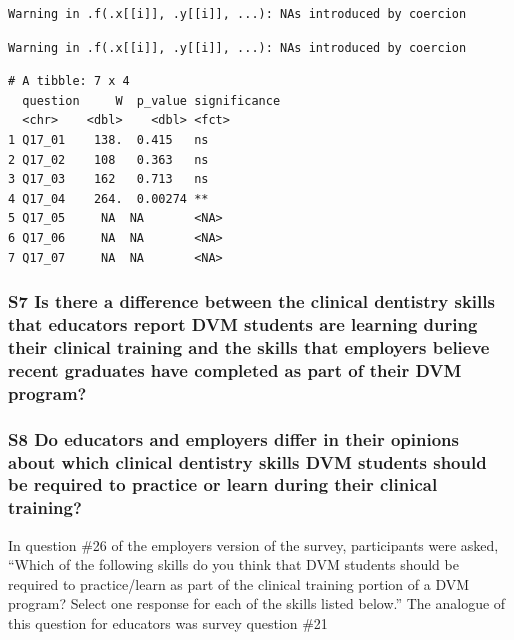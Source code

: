 \documentclass[
  11pt,
  letterpaper,
  DIV=11,
  numbers=noendperiod]{scrartcl}
\begin{document}
\begin{verbatim}
Warning in .f(.x[[i]], .y[[i]], ...): NAs introduced by coercion
\end{verbatim}

\begin{verbatim}
Warning in .f(.x[[i]], .y[[i]], ...): NAs introduced by coercion
\end{verbatim}

\begin{verbatim}
# A tibble: 7 x 4
  question     W  p_value significance
  <chr>    <dbl>    <dbl> <fct>       
1 Q17_01    138.  0.415   ns          
2 Q17_02    108   0.363   ns          
3 Q17_03    162   0.713   ns          
4 Q17_04    264.  0.00274 **          
5 Q17_05     NA  NA       <NA>        
6 Q17_06     NA  NA       <NA>        
7 Q17_07     NA  NA       <NA>        
\end{verbatim}

\subsubsection{S7 Is there a difference between the clinical dentistry
skills that educators report DVM students are learning during their
clinical training and the skills that employers believe recent graduates
have completed as part of their DVM
program?}\label{s7-is-there-a-difference-between-the-clinical-dentistry-skills-that-educators-report-dvm-students-are-learning-during-their-clinical-training-and-the-skills-that-employers-believe-recent-graduates-have-completed-as-part-of-their-dvm-program}

\subsubsection{S8 Do educators and employers differ in their opinions
about which clinical dentistry skills DVM students should be required to
practice or learn during their clinical
training?}\label{s8-do-educators-and-employers-differ-in-their-opinions-about-which-clinical-dentistry-skills-dvm-students-should-be-required-to-practice-or-learn-during-their-clinical-training}

In question \#26 of the employers version of the survey, participants
were asked, ``Which of the following skills do you think that DVM
students should be required to practice/learn as part of the clinical
training portion of a DVM program? Select one response for each of the
skills listed below.'' The analogue of this question for educators was
survey question \#21
\end{document}

